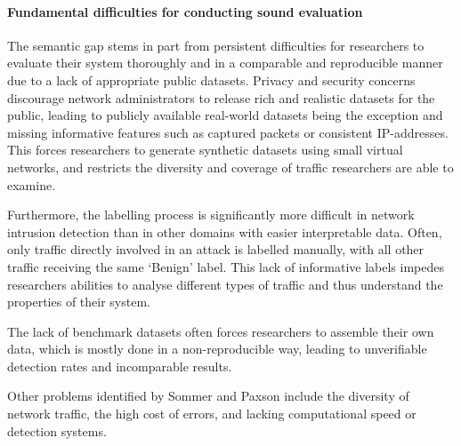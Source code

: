 \documentclass[sigconf]{acmart}
\begin{document}
\paragraph{Fundamental difficulties for conducting sound evaluation}

The semantic gap stems in part from persistent difficulties for researchers to evaluate their system thoroughly and in a comparable and reproducible manner due to a lack of appropriate public datasets. Privacy and security concerns discourage network administrators to release rich and realistic datasets for the public,  leading to publicly available real-world datasets being the exception and missing informative features such as captured packets or consistent IP-addresses. This forces researchers to generate synthetic datasets using small virtual networks, and restricts the diversity and coverage of traffic researchers are able to examine.

Furthermore, the labelling process is significantly more difficult in network intrusion detection than in other domains with easier interpretable data. Often, only traffic directly involved in an attack is labelled manually, with all other traffic receiving the same `Benign' label. This lack of informative labels impedes researchers abilities to analyse different types of traffic and thus understand the properties of their system.

The lack of benchmark datasets often forces researchers to assemble their own data, which is mostly done in a non-reproducible way, leading to unverifiable detection rates and incomparable results.


\vspace{0.2cm}
Other problems identified by Sommer and Paxson include the diversity of network traffic, the high cost of errors, and lacking computational speed or detection systems.





 


\end{document}
